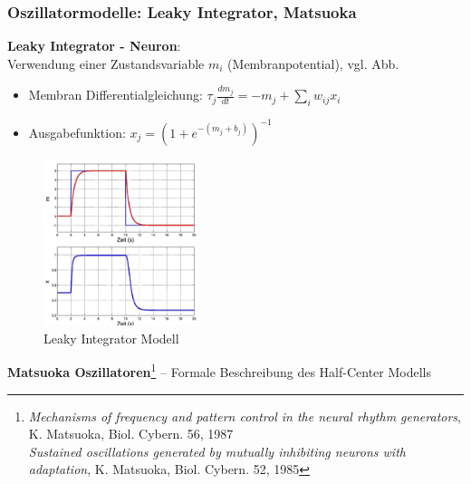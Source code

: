 \subsubsection{Oszillatormodelle: Leaky Integrator, Matsuoka}
\textbf{\glqq Leaky Integrator\grqq{} - Neuron}:\\
Verwendung einer Zustandsvariable $m_i$ (Membranpotential), vgl. Abb.
\begin{itemize}
\item Membran Differentialgleichung: $\tau_j\frac{dm_j}{dt} = - m_j + \sum\limits_i w_{ij}x_i$
\item Ausgabefunktion: $x_j = \left(1+e^{-(m_j + b_j)}\right)^{-1}$
\end{itemize}
\begin{figure}[h!]
	\centering
	\includegraphics[width=0.4\textwidth]{figures/ch05_leakyIntegrator.png}
	\caption{\glqq Leaky Integrator\grqq{} Modell}
	\label{LI}
\end{figure}
\textbf{Matsuoka Oszillatoren}\footnote{\textit{Mechanisms of frequency and pattern control in the neural rhythm generators}, K. Matsuoka, Biol. Cybern. 56, 1987\\
\textit{Sustained oscillations generated by mutually inhibiting neurons with adaptation}, K. Matsuoka, Biol. Cybern. 52, 1985} -- Formale Beschreibung des Half-Center Modells
